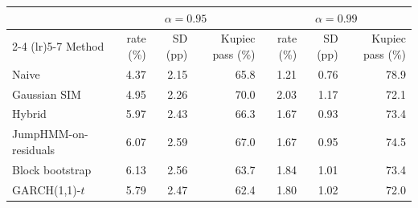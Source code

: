 \begin{tabular}{lrrrrrr}
\toprule
 & \multicolumn{3}{c}{$\alpha = 0.95$} & \multicolumn{3}{c}{$\alpha = 0.99$} \\
\cmidrule(lr){2-4} \cmidrule(lr){5-7}
Method & rate (\%) & SD (pp) & Kupiec pass (\%) & rate (\%) & SD (pp) & Kupiec pass (\%) \\
\midrule
Naive & 4.37 & 2.15 & 65.8 & 1.21 & 0.76 & 78.9 \\
Gaussian SIM & 4.95 & 2.26 & 70.0 & 2.03 & 1.17 & 72.1 \\
Hybrid & 5.97 & 2.43 & 66.3 & 1.67 & 0.93 & 73.4 \\
JumpHMM-on-residuals & 6.07 & 2.59 & 67.0 & 1.67 & 0.95 & 74.5 \\
Block bootstrap & 6.13 & 2.56 & 63.7 & 1.84 & 1.01 & 73.4 \\
GARCH(1,1)-$t$ & 5.79 & 2.47 & 62.4 & 1.80 & 1.02 & 72.0 \\
\bottomrule
\end{tabular}
